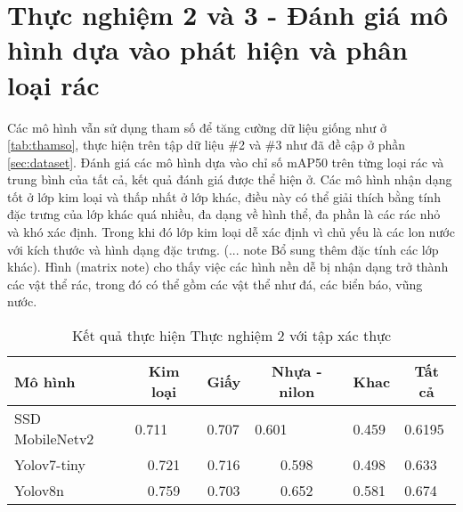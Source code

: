 \documentclass[../the.tex]{subfiles}
\begin{document}
\section{Thực nghiệm 2 và 3 - Đánh giá mô hình dựa vào phát hiện và phân loại rác}
 {\fontsize{13}{12} \selectfont
  Các mô hình vẫn sử dụng tham số để tăng cường dữ liệu giống như ở \ref{tab:thamso}, thực hiện trên tập dữ liệu \#2 và \#3 như đã đề cập ở phần \ref{sec:dataset}.
  Đánh giá các mô hình dựa vào chỉ số mAP50 trên từng loại rác và trung bình của tất cả, kết quả đánh giá được thể hiện ở.
 }
\bigskip
{\fontsize{13}{12} \selectfont
    Các mô hình nhận dạng tốt ở lớp kim loại và thấp nhất ở lớp khác,
    điều này có thể giải thích bằng tính đặc trưng của lớp khác quá nhiều, đa dạng về hình thể, đa phần là các rác nhỏ và khó xác định.
    Trong khi đó lớp kim loại dễ xác định vì chủ yếu là các lon nước với kích thước và hình dạng đặc trưng. (... note Bổ sung thêm đặc tính các lớp khác).
    Hình (matrix note) cho thấy việc các hình nền dễ bị nhận dạng trở thành các vật thể rác, trong đó có thể gồm các vật thể như đá, các biển báo, vũng nước.
}
\begin{table}[ht!]
    \centering
    \caption{Kết quả thực hiện Thực nghiệm 2 với tập xác thực}
    \begin{tabular}{|l|c|c|c|l|l|}
        \hline
        \textbf{Mô hình}  & \textbf{Kim loại}          & \textbf{Giấy}              & \textbf{Nhựa - nilon}      & \multicolumn{1}{c|}{\textbf{Khac}} & \multicolumn{1}{c|}{\textbf{Tất cả}} \\ \hline
        SSD   MobileNetv2 & \multicolumn{1}{l|}{0.711} & \multicolumn{1}{l|}{0.707} & \multicolumn{1}{l|}{0.601} & 0.459                              & 0.6195                               \\ \hline
        Yolov7-tiny       & 0.721                      & 0.716                      & 0.598                      & 0.498                              & 0.633                                \\ \hline
        Yolov8n           & 0.759                      & 0.703                      & 0.652                      & 0.581                              & 0.674                                \\ \hline
    \end{tabular}
    \label{tab:thucnghiem2.1}
\end{table}
\end{document}
